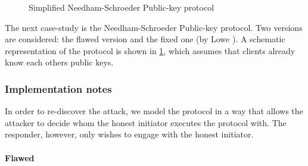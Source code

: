 \begin{figure}[t]
    \setmscoptions
    \begin{msc}{}
    
    

    \nextlevel[4]


    \nextlevel[3]    
    \nextlevel



    \nextlevel[3]
    \nextlevel[2]

    \end{msc}

    \centering
    \caption{Simplified Needham-Schroeder Public-key protocol}
    \label{fig:NSPK}
\end{figure}

The next case-study is the Needham-Schroeder Public-key protocol. Two versions are considered: the flawed version and the fixed one (by Lowe \cite{NSPK_LoweGavin}). A schematic representation of the protocol is shown in \cref{fig:NSPK}, which assumes that clients already know each others public keys.

\subsubsection{Implementation notes}

In order to re-discover the attack, we model the protocol in a way that allows the attacker to decide whom the honest initiator executes the protocol with. The responder, however, only wishes to engage with the honest initiator.

\paragraph{Flawed} 

